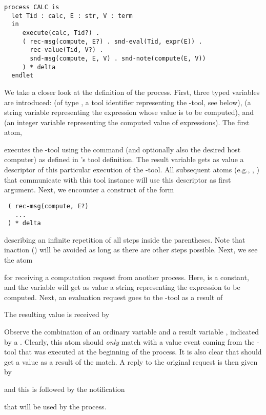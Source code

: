 \small
\begin{verbatim}
process CALC is
  let Tid : calc, E : str, V : term
  in
     execute(calc, Tid?) .
     ( rec-msg(compute, E?) . snd-eval(Tid, expr(E)) .
       rec-value(Tid, V?) .
       snd-msg(compute, E, V) . snd-note(compute(E, V))
     ) * delta
  endlet

\end{verbatim}
\noindent
\normalsize
 We take a closer look at the definition of the  process.
 First, three typed variables are introduced:  (of type ,
 a tool identifier representing the -tool, see below),
  (a string variable representing the expression whose value is to be computed),
 and  (an integer variable representing the computed value of expressions).
 The first atom,
 \begin{quote}
 \end{quote}
 executes the -tool using the
 command (and optionally also the desired host computer)
 as defined in 's tool definition.  The
 result variable  gets as value a descriptor of
 this particular execution of the -tool. All
 subsequent atoms (e.g., , )
 that communicate with this tool instance will use this descriptor as
 first argument. Next, we encounter a construct of the form
 \begin{verbatim}
 ( rec-msg(compute, E?)
   ...
 ) * delta
 \end{verbatim}
 describing an infinite repetition of all steps inside the parentheses.
 Note that inaction () will be avoided as long as there
 are other steps possible.
 Next, we see the atom
 \begin{quote}
 \end{quote}
 for receiving a computation request from another process. Here, 
 is a constant, and the variable  will get as value a string
 representing the expression to be computed. Next, an evaluation request
 goes to the -tool as a result of
 \begin{quote}
 \end{quote}
 The resulting value is received by
 \begin{quote}
 \end{quote}
 Observe the combination of an ordinary variable  and
 a result variable , indicated by a .  
 Clearly, this atom should {\em only}
 match with a value event coming from the -tool that was
 executed at the beginning of the  process.  It is also
 clear that  should get a value as a result of the match.
 A reply to the original request  is then given by
 \begin{quote}
 \end{quote}
 and this is followed by the notification
 \begin{quote}
 \end{quote}
 that will be used by the  process.

